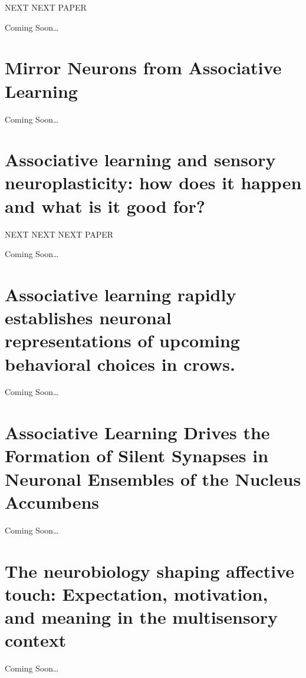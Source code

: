 \documentclass[11pt, a4paper, oneside]{article}   	%
\begin{document}
NEXT NEXT PAPER

Coming Soon\ldots


\section{Mirror Neurons from Associative Learning \cite{Catmur2016}}

Coming Soon\ldots


\section{Associative learning and sensory neuroplasticity: how does it happen and what is it good for? \cite{McGann2015}}

NEXT NEXT NEXT PAPER
 
Coming Soon\ldots


\section{Associative learning rapidly establishes neuronal representations of upcoming behavioral choices in crows. \cite{Veit2015}}

Coming Soon\ldots


\section{Associative Learning Drives the Formation of Silent Synapses in Neuronal Ensembles of the Nucleus Accumbens \cite{Whitaker2015}}

Coming Soon\ldots

\section{The neurobiology shaping affective touch: Expectation, motivation, and meaning in the multisensory context \cite{Ellingsen2016}}

Coming Soon\ldots



\end{document}
